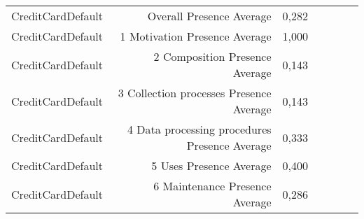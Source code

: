 \begin{table}[t]
\begin{tabular}{|p{2cm}|r|r|r|r|r|r|}
CreditCardDefault & Overall Presence Average & 0,282\cellcolor[HTML]{FCA78D}\\
CreditCardDefault & 1 Motivation Presence Average & 1,000\cellcolor[HTML]{FEE0D2}\\
CreditCardDefault & 2 Composition Presence Average & 0,143\cellcolor[HTML]{FC9D7F}\\
CreditCardDefault & 3 Collection processes Presence Average & 0,143\cellcolor[HTML]{FC9D7F}\\
CreditCardDefault & 4 Data processing procedures Presence Average & 0,333\cellcolor[HTML]{FCAB91}\\
CreditCardDefault & 5 Uses Presence Average & 0,400\cellcolor[HTML]{FCB198}\\
CreditCardDefault & 6 Maintenance Presence Average & 0,286\cellcolor[HTML]{FCA88D}\\
\hline
\end{tabular}
\end{table}
